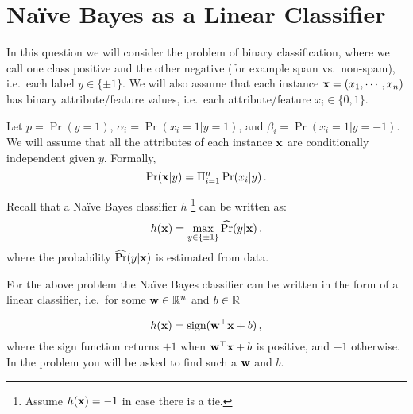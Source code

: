 
\section{Na{\"i}ve Bayes as a Linear Classifier}
In this question we will consider the problem of binary classification, where we call one class positive and the other negative (for example spam vs.\ non-spam), i.e.\ each label $y \in \{\pm 1\}$.
We will also assume that each instance $\mathbf{x} = (x_1, \cdots, x_n)$ has binary attribute/feature values, i.e.\ each attribute/feature $x_i \in \{0,1\}$. 

Let $p = \Pr(y =1)$, $\alpha_i = \Pr(x_i = 1 | y = 1)$, and $\beta_i = \Pr(x_i = 1 | y = -1)$. We will assume that all the attributes of each instance $\mathbf{x}$ are conditionally independent given $y$. Formally,
\[
\Pr(\mathbf{x} | y) = \Pi_{i=1}^n \Pr( x_i | y )
	\,.
\]


Recall that a Na{\"i}ve Bayes classifier $h$ \footnote{Assume $h(\mathbf{x}) = -1$ in case there is a tie.} can be written as:
\begin{equation}
h(\mathbf{x}) = \max_{y \in \{\pm 1\}} \widehat{\Pr}(y | \mathbf{x}) \label{eq:bayes}
	\,,
\end{equation}
where the probability $\widehat{\Pr}(y | \mathbf{x})$ is estimated from data.

For the above problem the Na{\"i}ve Bayes classifier can be written in the form of a linear classifier, i.e.\ for some $\mathbf{w} \in {\mathbb R}^{n}$ and $b \in {\mathbb R}$

\[
h(\mathbf{x}) = \text{sign} (\mathbf{w}^\top \mathbf{x} + b)
	\,,
\] 
 where the sign function returns $+1$ when $\mathbf{w}^\top \mathbf{x} + b$ is positive, and $-1$ otherwise.
In the problem you will be asked to find such a $\mathbf{w}$ and $b$. 




